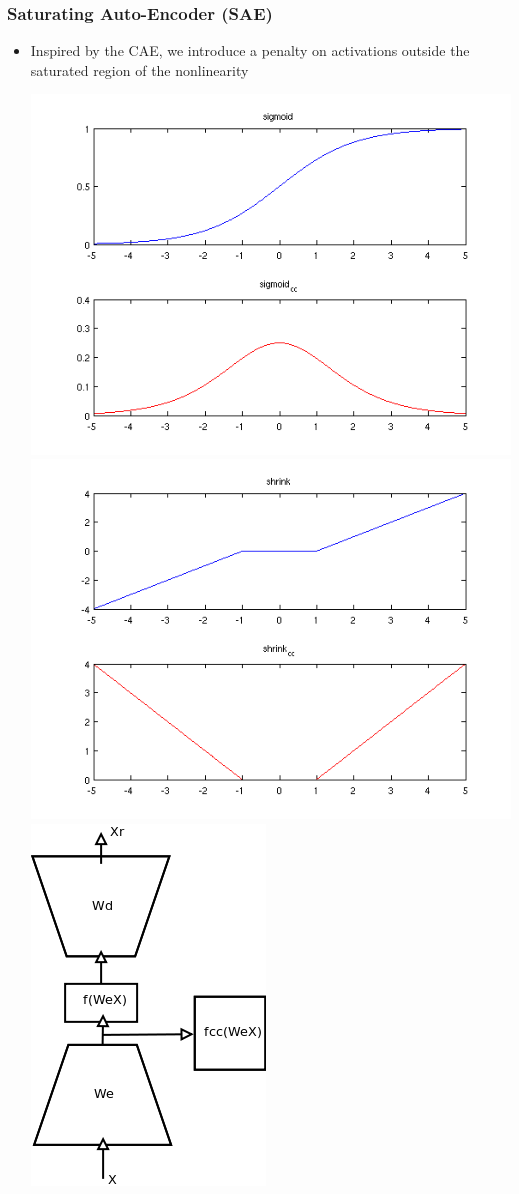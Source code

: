 \documentclass{beamer}
\begin{document}
\begin{frame}
\frametitle{Saturating Auto-Encoder (SAE)} 
\begin{itemize}
\item{Inspired by the CAE, we introduce a penalty on activations outside the saturated region of the nonlinearity} 
\begin{center}
\includegraphics[scale = 0.25]{sigmoid_cc.png}
\includegraphics[scale = 0.25]{shrink_cc.png} \\
\includegraphics[scale = 0.25]{SAE.png}

\end{center}
\end{itemize}
\end{frame}
\end{document}
